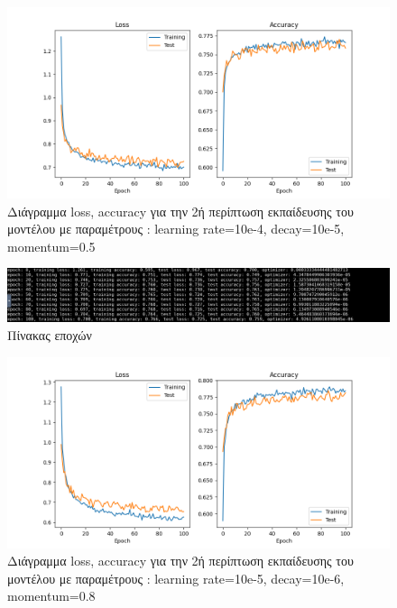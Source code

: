 \begin{figure}[ht]
	\centering
	\includegraphics[width=1\linewidth]{Results/Optimizers/optimizer_sgd_20k.png}
	\caption{ Διάγραμμα loss, accuracy για την 2ή περίπτωση εκπαίδευσης του μοντέλου με παραμέτρους : learning rate=10e-4, decay=10e-5, momentum=0.5 }
	\label{f:g3}	
\end{figure}


\begin{figure}[ht]
	\centering
	\includegraphics[width=1\linewidth]{Results/Optimizers/optimizer_sgd_20k1.png}
	\caption{Πίνακας εποχών}
	\label{f:g4}	
\end{figure}

\begin{figure}[ht]
	\centering
	\includegraphics[width=1\linewidth]{Results/Optimizers/optimizer_sgd_2_20k.png}
	\caption{ Διάγραμμα loss, accuracy για την 2ή περίπτωση εκπαίδευσης του μοντέλου με παραμέτρους : learning rate=10e-5, decay=10e-6, momentum=0.8}
	\label{f:g5}	
\end{figure}


